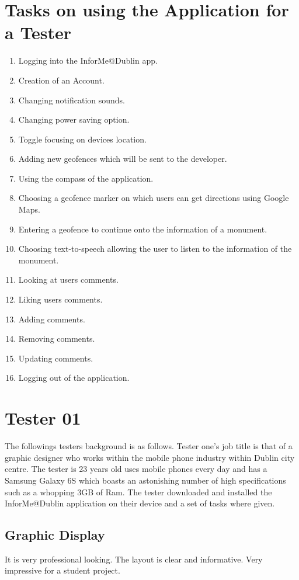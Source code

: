 \section{Tasks on using the Application for a Tester}
\begin{enumerate}
\item Logging into the InforMe@Dublin app.
\item Creation of an Account.
\item Changing notification sounds.
\item Changing power saving option.
\item Toggle focusing on devices location.
\item Adding new geofences which will be sent to the developer.
\item Using the compass of the application.
\item Choosing a geofence marker on which users can get directions using Google Maps.
\item Entering a geofence to continue onto the information of a monument.
\item Choosing text-to-speech allowing the user to listen to the information of the monument.
\item Looking at users comments.
\item Liking users comments.
\item Adding comments.
\item Removing comments.
\item Updating comments.
\item Logging out of the application. 
\end{enumerate}
\section{Tester 01}
The followings testers background is as follows. Tester one's job title is that of a graphic designer who works within the mobile phone industry within Dublin city centre. The tester is 23 years old uses mobile phones every day and has a Samsung Galaxy 6S which boasts an astonishing number of high specifications such as a whopping 3GB of Ram. The tester downloaded and installed the InforMe@Dublin application on their device and a set of tasks where given.

\subsection{Graphic Display}
It is very professional looking. The layout is clear and informative. Very impressive for a student project.

